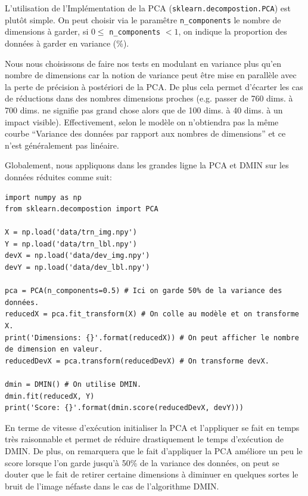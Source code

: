 \documentclass[12pt,a4paper]{article}
\begin{document}
{L'utilisation de l'Implémentation de la PCA (\lstinline[style=default]|sklearn.decompostion.PCA|) est plutôt simple. 
On peut choisir via le paramêtre \lstinline[style=default]|n_components| le nombre de dimensions à garder, \linebreak[4] si $0 \leq$  \lstinline[style=default]|n_components| $< 1$, on indique la proportion des données à garder en variance (\%).

Nous nous choisissons de faire nos tests en modulant en variance plus qu'en nombre de dimensions car la notion de variance peut être mise en parallèle avec la perte de précision à postériori de la PCA.
De plus cela permet d'écarter les cas de réductions dans des nombres dimensions proches (e.g. passer de 760 dims. à 700 dims. ne signifie pas grand chose alors que de 100 dims. à 40 dims. à un impact visible). Effectivement, selon le modèle on n'obtiendra pas la même courbe ``Variance des données par rapport aux nombres de dimensions'' et ce n'est généralement pas linéaire.

Globalement, nous appliquons dans les grandes ligne la PCA et DMIN sur les données réduites comme suit:
\begin{lstlisting}[style=darkula]
import numpy as np
from sklearn.decompostion import PCA

X = np.load('data/trn_img.npy')
Y = np.load('data/trn_lbl.npy')
devX = np.load('data/dev_img.npy')
devY = np.load('data/dev_lbl.npy')

pca = PCA(n_components=0.5) # Ici on garde 50% de la variance des données.
reducedX = pca.fit_transform(X) # On colle au modèle et on transforme X.
print('Dimensions: {}'.format(reducedX)) # On peut afficher le nombre de dimension en valeur.
reducedDevX = pca.transform(reducedDevX) # On transforme devX.

dmin = DMIN() # On utilise DMIN.
dmin.fit(reducedX, Y)
print('Score: {}'.format(dmin.score(reducedDevX, devY)))

\end{lstlisting}

En terme de vitesse d'exécution initialiser la PCA et l'appliquer se fait en temps très raisonnable et permet de réduire drastiquement le temps d'exécution de DMIN. De plus, on remarquera que le fait d'appliquer la PCA améliore un peu le score lorsque l'on garde jusqu'à 50\% de la variance des données, on peut se douter que le fait de retirer certaine dimensions à diminuer en quelques sortes le bruit de l'image néfaste dans le cas de l'algorithme DMIN.

}
\end{document}
